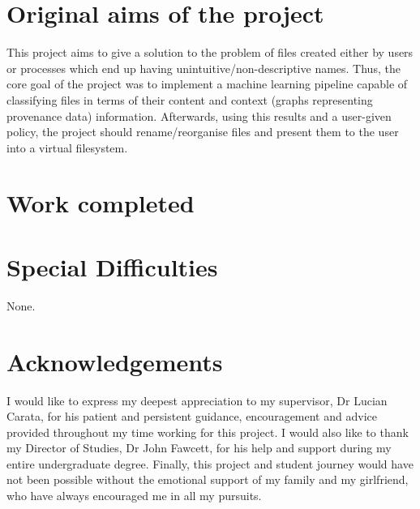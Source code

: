 \documentclass[12pt,a4paper,oneside]{report}
\begin{document}

\section*{Original aims of the project}

This project aims to give a solution to the problem of files created either by users or processes which end up having unintuitive/non-descriptive names. Thus, the core goal of the project was to implement a machine learning pipeline capable of classifying files in terms of their content and context (graphs representing provenance data) information. Afterwards, using this results and a user-given policy, the project should rename/reorganise files and present them to the user into a virtual filesystem.

\section*{Work completed}

\section*{Special Difficulties}
None.


\newpage
\tableofcontents
\listoffigures
\listoftables
\newpage
\section*{Acknowledgements}

I would like to express my deepest appreciation to my supervisor, Dr Lucian Carata, for his patient and persistent guidance, encouragement and advice provided throughout my time working for this project. I would also like to thank my Director of Studies, Dr John Fawcett, for his help and support during my entire undergraduate degree. Finally, this project and student journey would have not been possible without the emotional support of my family and my girlfriend, who have always encouraged me in all my pursuits.






\appendix
% 


\nocite{pnn, polonium, pnn-parallel, sigmoidal, nonlinearities, DBLP:journals/corr/LuongPM15, 7266837, 2017arXiv171010903V, 279181, DBLP:journals/corr/KingmaB14, DBLP:journals/corr/VaswaniSPUJGKP17, REST-general, chollet2015keras, DBLP:journals/corr/IoffeS15, Rutkowski2004}
\end{document}
